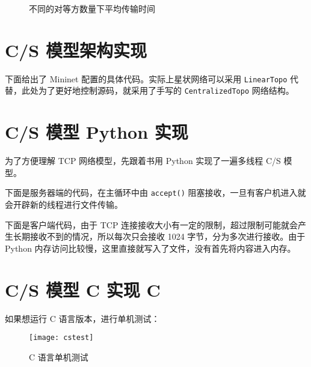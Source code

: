 
\begin{figure}[H]
    \centering
    \caption{不同的对等方数量下平均传输时间}\label{fig:p2pmodelstat}
\end{figure}

\appendix

\section{C/S 模型架构实现}

下面给出了 Mininet 配置的具体代码。实际上星状网络可以采用 \verb"LinearTopo" 代替，此处为了更好地控制源码，就采用了手写的 \verb"CentralizedTopo" 网络结构。


\section{C/S 模型 Python 实现 \faPython}

为了方便理解 TCP 网络模型，先跟着书用 Python 实现了一遍多线程 C/S 模型。

下面是服务器端的代码，在主循环中由 \verb"accept()" 阻塞接收，一旦有客户机进入就会开辟新的线程进行文件传输。


下面是客户端代码，由于 TCP 连接接收大小有一定的限制，超过限制可能就会产生长期接收不到的情况，所以每次只会接收 1024 字节，分为多次进行接收。由于 Python 内存访问比较慢，这里直接就写入了文件，没有首先将内容进入内存。


\section{C/S 模型 C 实现 \textsf{C}}

如果想运行 C 语言版本，进行单机测试：
\begin{figure}[H]
    \centering
    \texttt{[image: cstest]}
    \caption{C 语言单机测试}
\end{figure}

